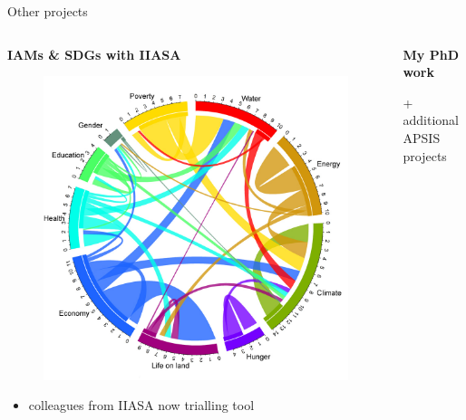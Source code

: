 \documentclass[9pt]{beamer}
\begin{document}
\begin{frame}[t]{Other projects}

\normalsize

\begin{columns}[t]
	\begin{column}{0.33\linewidth}
		\centering \textbf{ IAMs \& SDGs with IIASA}
		\begin{figure}
			\includegraphics[width=\linewidth]{images/wheel}
		\end{figure}
		\begin{itemize}
			\item colleagues from IIASA now trialling tool
		\end{itemize}
	\end{column}
	\begin{column}{0.33\linewidth}
		\centering \textbf{My PhD work}
		
		+ additional APSIS projects
		

\end{column}
\end{columns}
\end{frame}
\end{document}
